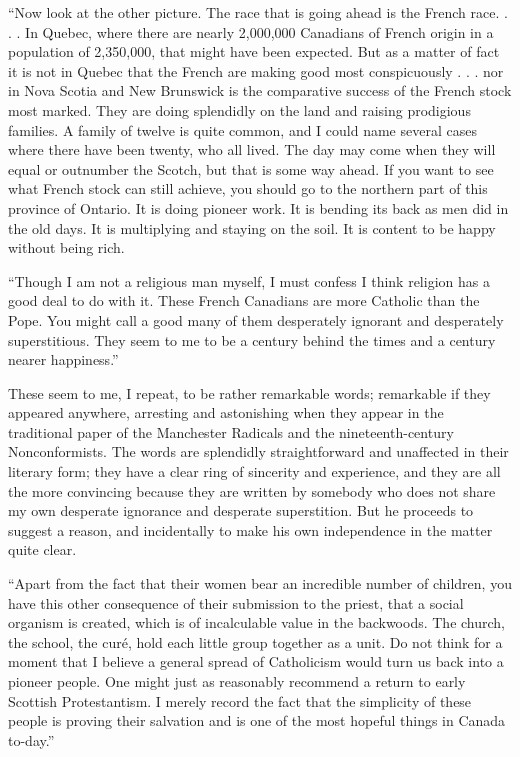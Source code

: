 \documentclass{book}
\begin{document}
“Now look at the other picture. The race that is going ahead is the French race. . . . In Quebec, where there are nearly 2,000,000 Canadians of French origin in a population of 2,350,000, that might have been expected. But as a matter of fact it is not in Quebec that the French are making good most conspicuously . . . nor in Nova Scotia and New Brunswick is the comparative success of the French stock most marked. They are doing splendidly on the land and raising prodigious families. A family of twelve is quite common, and I could name several cases where there have been twenty, who all lived. The day may come when they will equal or outnumber the Scotch, but that is some way ahead. If you want to see what French stock can still achieve, you should go to the northern part of this province of Ontario. It is doing pioneer work. It is bending its back as men did in the old days. It is multiplying and staying on the soil. It is content to be happy without being rich.

“Though I am not a religious man myself, I must confess I think religion has a good deal to do with it. These French Canadians are more Catholic than the Pope. You might call a good many of them desperately ignorant and desperately superstitious. They seem to me to be a century behind the times and a century nearer happiness.”

These seem to me, I repeat, to be rather remarkable words; remarkable if they appeared anywhere, arresting and astonishing when they appear in the traditional paper of the Manchester Radicals and the nineteenth-century Nonconformists. The words are splendidly straightforward and unaffected in their literary form; they have a clear ring of sincerity and experience, and they are all the more convincing because they are written by somebody who does not share my own desperate ignorance and desperate superstition. But he proceeds to suggest a reason, and incidentally to make his own independence in the matter quite clear.

“Apart from the fact that their women bear an incredible number of children, you have this other consequence of their submission to the priest, that a social organism is created, which is of incalculable value in the backwoods. The church, the school, the curé, hold each little group together as a unit. Do not think for a moment that I believe a general spread of Catholicism would turn us back into a pioneer people. One might just as reasonably recommend a return to early Scottish Protestantism. I merely record the fact that the simplicity of these people is proving their salvation and is one of the most hopeful things in Canada to-day.”
\end{document}
